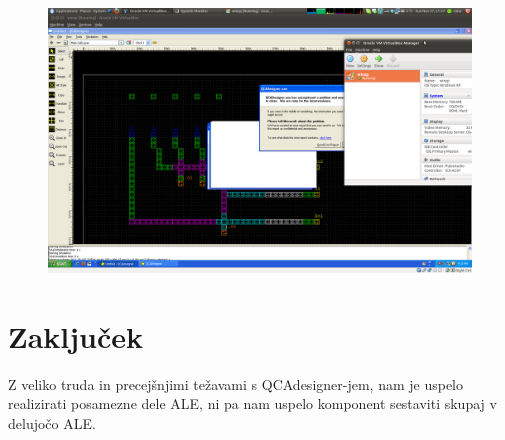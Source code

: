 \documentclass[seminar, slovene]{FRIreport}
\begin{document}
\begin{figure}[H]
\begin{center}
\includegraphics[width=14cm]{qca/img/screenshot}
\end{center}
\end{figure}

%
\section{Zaključek}
Z veliko truda in precejšnjimi težavami s QCAdesigner-jem, nam je uspelo realizirati posamezne dele ALE, ni pa nam uspelo komponent sestaviti skupaj v delujočo ALE.

%
\References


\end{document}

